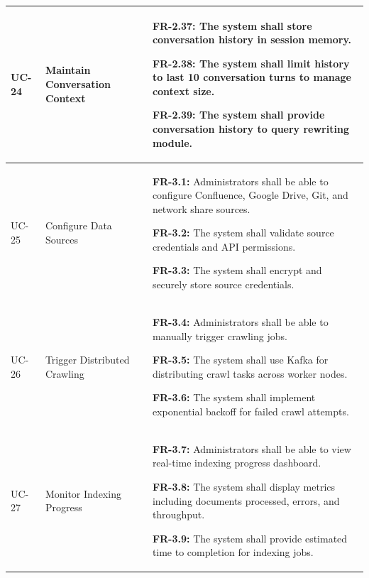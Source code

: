 \begin{longtable}{|>{\raggedright\arraybackslash}p{}|>{\raggedright\arraybackslash}p{}|>{\raggedright\arraybackslash}p{}|}
UC-24 & Maintain Conversation Context &
\begin{frequirements}
\item \textbf{FR-2.37:} The system shall store conversation history in session memory.
\item \textbf{FR-2.38:} The system shall limit history to last 10 conversation turns to manage context size.
\item \textbf{FR-2.39:} The system shall provide conversation history to query rewriting module.
\end{frequirements} \\
\hline

UC-25 & Configure Data Sources &
\begin{frequirements}
\item \textbf{FR-3.1:} Administrators shall be able to configure Confluence, Google Drive, Git, and network share sources.
\item \textbf{FR-3.2:} The system shall validate source credentials and API permissions.
\item \textbf{FR-3.3:} The system shall encrypt and securely store source credentials.
\end{frequirements} \\
\hline

UC-26 & Trigger Distributed Crawling &
\begin{frequirements}
\item \textbf{FR-3.4:} Administrators shall be able to manually trigger crawling jobs.
\item \textbf{FR-3.5:} The system shall use Kafka for distributing crawl tasks across worker nodes.
\item \textbf{FR-3.6:} The system shall implement exponential backoff for failed crawl attempts.
\end{frequirements} \\
\hline

UC-27 & Monitor Indexing Progress &
\begin{frequirements}
\item \textbf{FR-3.7:} Administrators shall be able to view real-time indexing progress dashboard.
\item \textbf{FR-3.8:} The system shall display metrics including documents processed, errors, and throughput.
\item \textbf{FR-3.9:} The system shall provide estimated time to completion for indexing jobs.
\end{frequirements} \\
\hline


\end{longtable}
